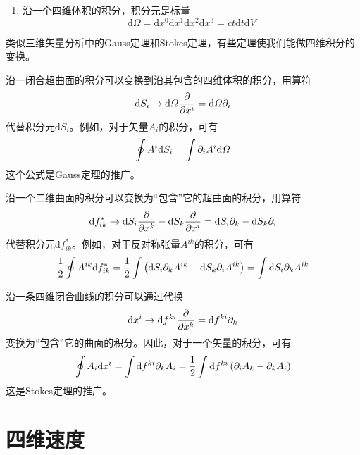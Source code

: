 \begin{enumerate}
\item 沿一个四维体积的积分，积分元是标量
\begin{equation}
	\mathrm{d}\varOmega = \mathrm{d}x^0\mathrm{d}x^1\mathrm{d}x^2\mathrm{d}x^3 = ct\mathrm{d}t\mathrm{d}V
\end{equation}
\end{enumerate}

类似三维矢量分析中的Gauss定理和Stokes定理，有些定理使我们能做四维积分的变换。

沿一闭合超曲面的积分可以变换到沿其包含的四维体积的积分，用算符
\begin{equation}
	\mathrm{d}S_i \to \mathrm{d}\varOmega \frac{\partial}{\partial x^i} = \mathrm{d}\varOmega \partial_i
\end{equation}
代替积分元$\mathrm{d}S_i$。例如，对于矢量$A_i$的积分，可有
\begin{equation}
	\oint A^i \mathrm{d}S_i = \int \partial_iA^i \mathrm{d}\varOmega
\end{equation}
这个公式是Gauss定理的推广。

沿一个二维曲面的积分可以变换为“包含”它的超曲面的积分，用算符
\begin{equation}
	\mathrm{d}f^*_{ik} \to \mathrm{d}S_i \frac{\partial}{\partial x^k} - \mathrm{d}S_k \frac{\partial}{\partial x^i} = \mathrm{d}S_i \partial_k - \mathrm{d}S_k \partial_i
\end{equation}
代替积分元$\mathrm{d}f^*_{ik}$。例如，对于反对称张量$A^{ik}$的积分，可有
\begin{equation}
	\frac12 \oint A^{ik}\mathrm{d}f^*_{ik} = \frac12 \int \left(\mathrm{d}S_i \partial_kA^{ik} - \mathrm{d}S_k \partial_iA^{ik}\right) = \int \mathrm{d}S_i \partial_kA^{ik}
\end{equation}

沿一条四维闭合曲线的积分可以通过代换
\begin{equation}
	\mathrm{d}x^i \to \mathrm{d}f^{ki}\frac{\partial}{\partial x^k} = \mathrm{d}f^{ki} \partial_k
\end{equation}
变换为“包含”它的曲面的积分。因此，对于一个矢量的积分，可有
\begin{equation}
	\oint A_i \mathrm{d}x^i = \int \mathrm{d}f^{ki}\partial_kA_i = \frac12 \int \mathrm{d}f^{ki} \left(\partial_iA_k - \partial_kA_i\right)
\end{equation}
这是Stokes定理的推广。

\section{四维速度}

